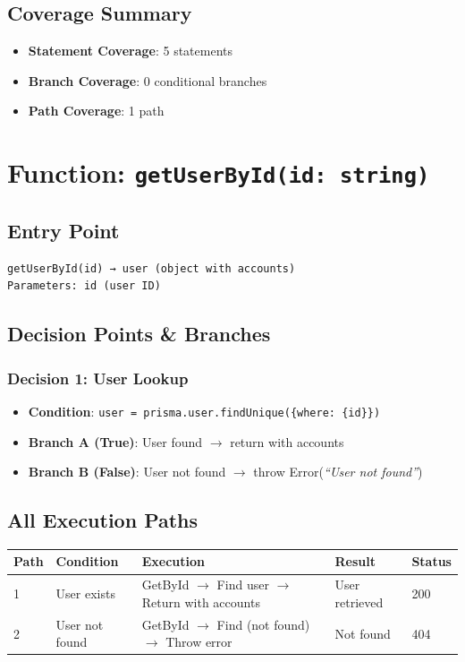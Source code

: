 \subsection{Coverage Summary}
\begin{itemize}
    \item \textbf{Statement Coverage}: 5 statements
    \item \textbf{Branch Coverage}: 0 conditional branches
    \item \textbf{Path Coverage}: 1 path
\end{itemize}

\section{Function: \texttt{getUserById(id: string)}}

\subsection{Entry Point}
\begin{verbatim}
getUserById(id) → user (object with accounts)
Parameters: id (user ID)
\end{verbatim}

\subsection{Decision Points \& Branches}

\subsubsection{Decision 1: User Lookup}
\begin{itemize}
    \item \textbf{Condition}: \texttt{user = prisma.user.findUnique(\{where: \{id\}\})}
    \item \textbf{Branch A (True)}: User found $\rightarrow$ return with accounts
    \item \textbf{Branch B (False)}: User not found $\rightarrow$ throw Error(\textit{``User not found''})
\end{itemize}

\subsection{All Execution Paths}

\begin{longtable}{|L{0.8cm}|L{3cm}|L{5.5cm}|L{2.5cm}|L{1.2cm}|}
\hline
\textbf{Path} & \textbf{Condition} & \textbf{Execution} & \textbf{Result} & \textbf{Status} \\
 & User exists & GetById $\rightarrow$ Find user $\rightarrow$ Return with accounts & User retrieved & 200 \\
 & User not found & GetById $\rightarrow$ Find (not found) $\rightarrow$ Throw error & Not found & 404 \\
\hline
\end{longtable}

